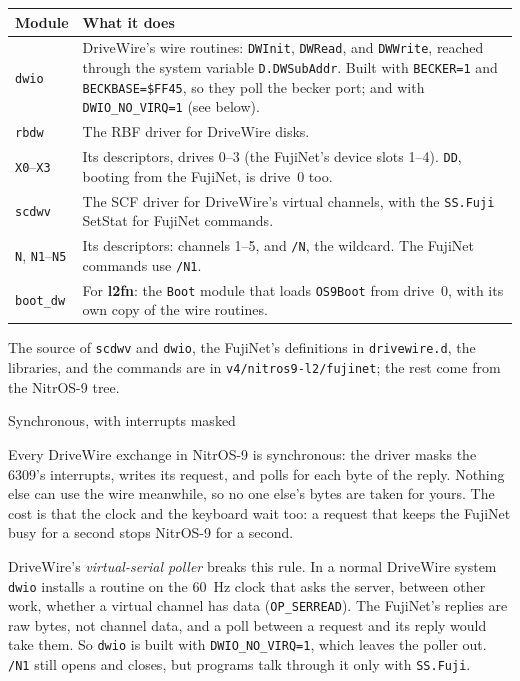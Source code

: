 \documentclass[10pt,twoside,openany]{book}
\makeatletter
\newcommand{\cmd}[1]{\textbf{#1}}            %
\newcommand{\file}[1]{\texttt{#1}}           %
\renewcommand{\subsection}{\@startsection{subsection}{2}{0pt}{2.4ex plus 0.6ex}{0.8ex}%
  {\sffamily\bfseries\normalsize}}
\makeatother
\begin{document}
\begin{tabularx}{\linewidth}{@{}>{\raggedright\arraybackslash}p{1.25in}X@{}}
\toprule
\textbf{Module} & \textbf{What it does}\\
\midrule
\file{dwio} & DriveWire's wire routines: \texttt{DWInit}, \texttt{DWRead},
and \texttt{DWWrite}, reached through the system variable
\texttt{D.DWSubAddr}. Built with \texttt{BECKER=1} and
\texttt{BECKBASE=\$FF45}, so they poll the becker port; and with
\texttt{DWIO\_NO\_VIRQ=1} (see below).\\
\file{rbdw} & The RBF driver for DriveWire disks.\\
\file{X0}--\file{X3} & Its descriptors, drives 0--3 (the FujiNet's
device slots 1--4). \file{DD}, booting from the FujiNet, is drive~0 too.\\
\file{scdwv} & The SCF driver for DriveWire's virtual channels, with the
\texttt{SS.Fuji} SetStat for FujiNet commands.\\
\file{N}, \file{N1}--\file{N5} & Its descriptors: channels 1--5, and
\file{/N}, the wildcard. The FujiNet commands use \file{/N1}.\\
\file{boot\_dw} & For \cmd{l2fn}: the \file{Boot} module that loads
\file{OS9Boot} from drive~0, with its own copy of the wire routines.\\
\bottomrule
\end{tabularx}

The source of \file{scdwv} and \file{dwio}, the FujiNet's definitions in
\file{drivewire.d}, the libraries, and the commands are in
\file{v4/nitros9-l2/fujinet}; the rest come from the NitrOS-9 tree.

\subsection{Synchronous, with interrupts masked}

Every DriveWire exchange in NitrOS-9 is synchronous: the driver masks the
6309's interrupts, writes its request, and polls for each byte of the
reply. Nothing else can use the wire meanwhile, so no one else's bytes
are taken for yours. The cost is that the clock and the keyboard wait too:
a request that keeps the FujiNet busy for a second stops NitrOS-9 for a
second.

DriveWire's \emph{virtual-serial poller} breaks this rule. In a normal
DriveWire system \file{dwio} installs a routine on the 60~Hz clock that
asks the server, between other work, whether a virtual channel has data
(\texttt{OP\_SERREAD}). The FujiNet's replies are raw bytes, not channel
data, and a poll between a request and its reply would take them. So
\file{dwio} is built with \texttt{DWIO\_NO\_VIRQ=1}, which leaves the
poller out. \file{/N1} still opens and closes, but programs talk through
it only with \texttt{SS.Fuji}.
\end{document}
